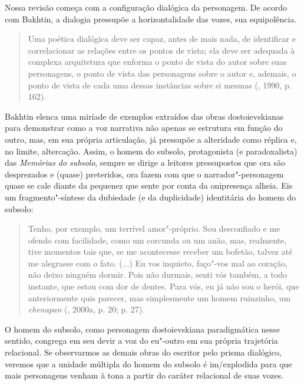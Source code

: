 {Nossa revisão começa com a configuração dialógica da personagem. De
acordo com Bakhtin, a dialogia pressupõe a horizontalidade das vozes,
sua equipolência.

\begin{quote}
Uma poética dialógica deve ser capaz, antes de mais nada, de identificar
e correlacionar as relações entre os pontos de vista; ela deve ser
adequada à complexa arquitetura que enforma o ponto de vista do autor
sobre suas personagens, o ponto de vista das personagens sobre o autor
e, ademais, o ponto de vista de cada uma dessas instâncias sobre si
mesmas (, 1990, p. 162).
\end{quote}

Bakhtin elenca uma miríade de exemplos extraídos das obras
dostoievskianas para demonstrar como a voz narrativa não apenas se
estrutura em função do outro, mas, em sua própria articulação, já
pressupõe a alteridade como réplica e, no limite, altercação. Assim, o
homem do subsolo, protagonista (e paradoxalista) das \emph{Memórias do
subsolo}, sempre se dirige a leitores pressupostos que ora são
desprezados e (quase) preteridos, ora fazem com que o
narrador"-personagem quase se cale diante da pequenez que sente por conta
da onipresença alheia. Eis um fragmento"-síntese da dubiedade (e da
duplicidade) identitária do homem do subsolo:

\begin{quote}
Tenho, por exemplo, um terrível amor"-próprio. Sou desconfiado e me
ofendo com facilidade, como um corcunda ou um anão, mas, realmente, tive
momentos tais que, se me acontecesse receber um bofetão, talvez até me
alegrasse com o fato. (...) Eu vos inquieto, faço"-vos mal ao coração,
não deixo ninguém dormir. Pois não durmais, senti vós também, a todo
instante, que estou com dor de dentes. Para vós, eu já não sou o herói,
que anteriormente quis parecer, mas simplesmente um homem ruinzinho, um
\emph{chenapan} (, 2000a, p. 20; p. 27).
\end{quote}

O homem do subsolo, como personagem dostoievskiana paradigmática nesse
sentido, congrega em seu devir a voz do eu"-outro em sua própria
trajetória relacional. Se observarmos as demais obras do escritor pelo
prisma dialógico, veremos que a unidade múltipla do homem do subsolo é
im/explodida para que mais personagens venham à tona a partir do caráter
relacional de suas vozes.

}
